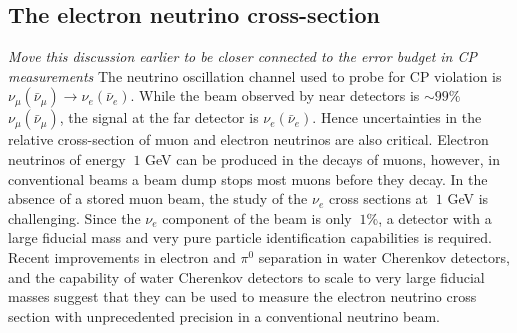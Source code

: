 \subsection{The electron neutrino cross-section}
{\color{red} \it Move this discussion earlier to be closer connected to the error budget in CP measurements }
The neutrino oscillation channel used to probe for CP violation is $\nu_{\mu}(\bar{\nu}_{\mu})\rightarrow\nu_{e}(\bar{\nu}_{e})$.
While the beam observed by near detectors is $\sim99\%$ $\nu_{\mu}(\bar{\nu}_{\mu})$, the signal at the far detector
is $\nu_{e}(\bar{\nu}_{e})$.  Hence uncertainties in the relative cross-section of muon and electron neutrinos are also
critical.  Electron neutrinos of energy $~1$ GeV can be produced in the decays of muons, however, in conventional beams a
beam dump stops most muons before they decay.
In the absence of a stored muon beam, the study of the $\nu_{e}$ cross sections at $~1$ GeV is challenging.  Since the
$\nu_{e}$ component of the beam is only $~1\%$, a detector with a large fiducial mass and very pure particle identification 
capabilities is required.  Recent improvements in electron and $\pi^{0}$ separation in water Cherenkov detectors, and the capability 
of water Cherenkov detectors to scale to very large fiducial masses suggest that they can be used to measure the electron
neutrino cross section with unprecedented precision in a conventional neutrino beam.


